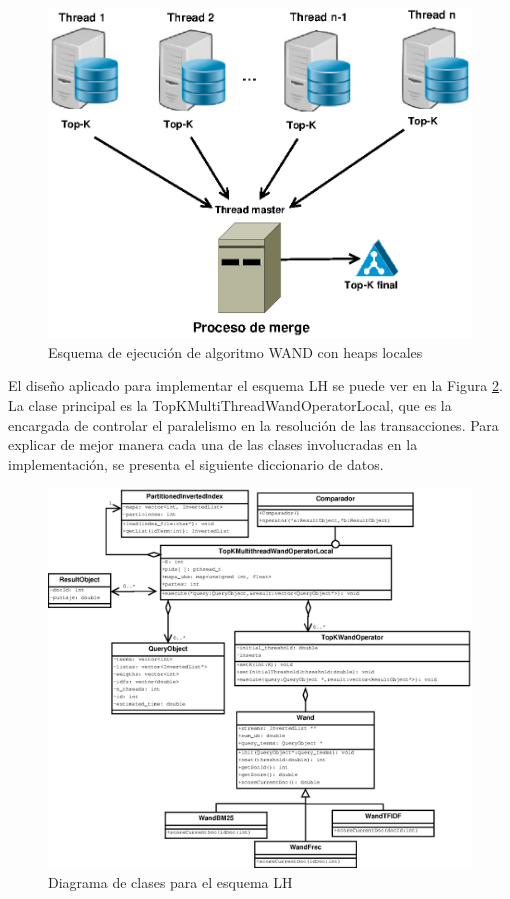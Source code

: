 \begin{figure}[!ht]
\centering
\includegraphics[scale=.75]{images/wand_heaps_locales.eps}
\caption{Esquema de ejecución de algoritmo WAND con heaps locales}
\label{fig:wand-heap-local}
\end{figure}

El diseño aplicado para implementar el esquema LH se puede ver en la Figura \ref{fig:TopKMultiThreadWandOperatorLocal}. La clase principal es la TopKMultiThreadWandOperatorLocal, que es la encargada de controlar el paralelismo en la resolución de las transacciones. Para explicar de mejor manera cada una de las clases involucradas en la implementación, se presenta el siguiente diccionario de datos.

\begin{figure}[!ht]
\centering
\includegraphics[scale=.75]{images/TopKMultiThreadWandOperatorLocal.eps}
\caption{Diagrama de clases para el esquema LH}
\label{fig:TopKMultiThreadWandOperatorLocal}
\end{figure}

